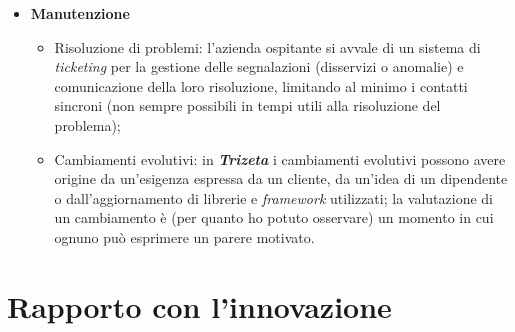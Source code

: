 \begin{itemize}
        {}
    \item \textbf{Manutenzione}
        \begin{itemize}
            \item Risoluzione di problemi: l'azienda ospitante si avvale di un sistema di \textit{ticketing} per la gestione delle segnalazioni (disservizi o anomalie) e comunicazione
                della loro risoluzione, limitando al minimo i contatti sincroni (non sempre possibili in tempi utili alla risoluzione del problema);
            \item Cambiamenti evolutivi: in \textit{\textbf{Trizeta}} i cambiamenti evolutivi possono avere origine da un'esigenza espressa da un cliente, da un'idea di un dipendente o dall'aggiornamento di librerie e \textit{framework} utilizzati; 
                la valutazione di un cambiamento è (per quanto ho potuto osservare) un momento in cui ognuno può esprimere un parere motivato. 
        \end{itemize}
\end{itemize}


\section{Rapporto con l'innovazione}

